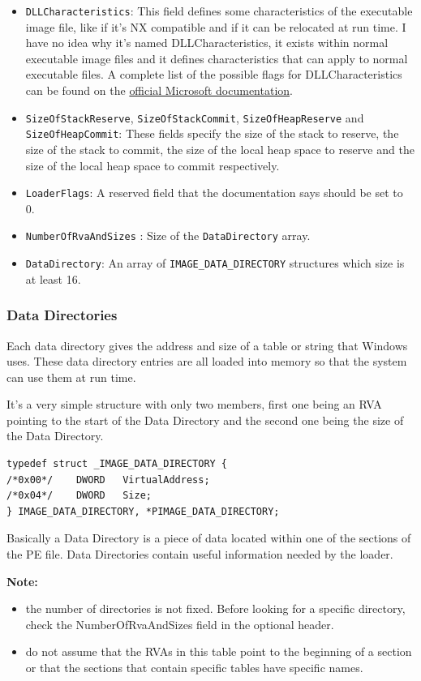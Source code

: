 \begin{itemize}
    \item \verb+DLLCharacteristics+: This field defines some characteristics of the executable image file, like if it’s NX compatible and if it can be relocated at run time. I have no idea why it’s named DLLCharacteristics, it exists within normal executable image files and it defines characteristics that can apply to normal executable files. A complete list of the possible flags for DLLCharacteristics can be found on the \href{https://learn.microsoft.com/en-us/windows/win32/debug/pe-format#windows-subsystem}{official Microsoft documentation}.
    \item \verb+SizeOfStackReserve+, \verb+SizeOfStackCommit+, \verb+SizeOfHeapReserve+ and \verb+SizeOfHeapCommit+: These fields specify the size of the stack to reserve, the size of the stack to commit, the size of the local heap space to reserve and the size of the local heap space to commit respectively.
    \item \verb+LoaderFlags+: A reserved field that the documentation says should be set to 0.
    \item \verb+NumberOfRvaAndSizes+ : Size of the \verb+DataDirectory+ array.
    \item \verb+DataDirectory+: An array of \verb+IMAGE_DATA_DIRECTORY+ structures which size is at least 16.
\end{itemize}

\subsubsection{Data Directories}
Each data directory gives the address and size of a table or string that Windows uses. These data directory entries are all loaded into memory so that the system can use them at run time.  

It’s a very simple structure with only two members, first one being an RVA pointing to the start of the Data Directory and the second one being the size of the Data Directory.

\begin{verbatim}
typedef struct _IMAGE_DATA_DIRECTORY {
/*0x00*/    DWORD   VirtualAddress;
/*0x04*/    DWORD   Size;
} IMAGE_DATA_DIRECTORY, *PIMAGE_DATA_DIRECTORY;    
\end{verbatim}


Basically a Data Directory is a piece of data located within one of the sections of the PE file. Data Directories contain useful information needed by the loader.

{\bf Note:} 
\begin{itemize}
    \item the number of directories is not fixed. Before looking for a specific directory, check the NumberOfRvaAndSizes field in the optional header.
    \item do not assume that the RVAs in this table point to the beginning of a section or that the sections that contain specific tables have specific names.
\end{itemize}



